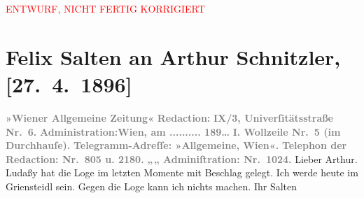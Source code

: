 
\begin{center}
            \textcolor{red}{ENTWURF, NICHT FERTIG KORRIGIERT}
                      \end{center}
            
         
         \renewcommand{\erwaehntePersonen}{Personen: Julius von Gans-Ludassy}
         \renewcommand{\erwaehnteInstitutionen}{Institutionen: Wiener Allgemeine Zeitung}
         \renewcommand{\erwaehnteOrte}{Orte: Café Griensteidl, Universitätsstraße, Wien, Wollzeile}
         \renewcommand{\erwaehnteWerke}{}
               \section[Felix Salten an Arthur Schnitzler, {[}27. 4. 1896{]}]{ Felix Salten an Arthur Schnitzler, {[}27. 4. 1896{]}}\nopagebreak{}\rehead{ }\begin{ledgroupsized}[t]{13cm}\normalsize\beginnumbering \toendnotes[C]{\smallbreak\pagebreak[2]} 
\pstart
           \noindent{}{\pb}\textcolor{gray}{\textbf{\textbf{»Wiener Allgemeine
                        Zeitung«}}}\pend
           \pstart
           \textcolor{gray}{\textbf{Redaction:}}\pend
           \pstart
           \textcolor{gray}{\textbf{\textbf{IX/3, Univerſitätsstraße Nr. 6.}}}\pend
           \pstart
           \textcolor{gray}{\textbf{Administration:}}\hfill \textcolor{gray}{\textbf{Wien, am ..........{ }189{\dots}}}\pend
           \pstart
           \textcolor{gray}{\textbf{\textbf{I. Wollzeile Nr. 5} (im Durchhauſe).}}\pend
           \pstart
           \textcolor{gray}{\textbf{Telegramm-Adreſſe: »Allgemeine, Wien«.}}\pend
           \pstart
           \textcolor{gray}{\textbf{Telephon der Redaction: Nr. 805 u. 2180.}}\pend
           \pstart
           \textcolor{gray}{\textbf{\hspace*{2.5em}„\hspace*{2.5em}„\hspace*{2.5em} Adminiſtration: Nr. 1024.}}\pend
           \pstart
           Lieber Arthur. Ludaßy hat die Loge im letzten Momente mit
               Beschlag gelegt. \pend
           \pstart
           Ich werde heute im Griensteidl sein. Gegen die
               Loge kann ich nichts machen. \pend
           \pstart Ihr \spacefill\mbox{Salten}\pend{}
         

\end{ledgroupsized}
